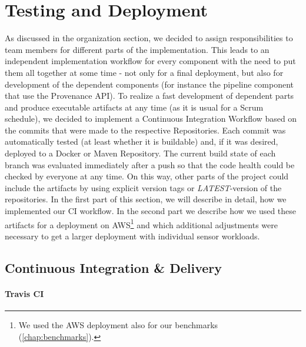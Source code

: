 \section{Testing and Deployment}
As discussed in the organization section, we decided to assign responsibilities to team members for different parts of the implementation.
This leads to an independent implementation workflow for every component with the need to put them all together at some time - not only for a final deployment, but also for development of the dependent components (for instance the pipeline component that use the Provenance API).
To realize a fast development of dependent parts and produce executable artifacts at any time (as it is usual for a Scrum schedule), we decided to implement a Continuous Integration Workflow based on the commits that were made to the respective Repositories. Each commit was automatically tested (at least whether it is buildable) and, if it was desired, deployed to a Docker or Maven Repository. The current build state of each branch was evaluated immediately after a push so that the code health could be checked by everyone at any time.
On this way, other parts of the project could include the artifacts by using explicit version tags or \emph{LATEST}-version of the repositories. In the first part of this section, we will describe in detail, how we implemented our CI workflow. In the second part we describe how we used these artifacts for a deployment on AWS\footnote{We used the AWS deployment also for our benchmarks (\ref{chap:benchmarks}).} and which additional adjustments were necessary to get a larger deployment with individual sensor workloads.

\subsection{Continuous Integration \& Delivery}

\paragraph*{Travis CI}
%

